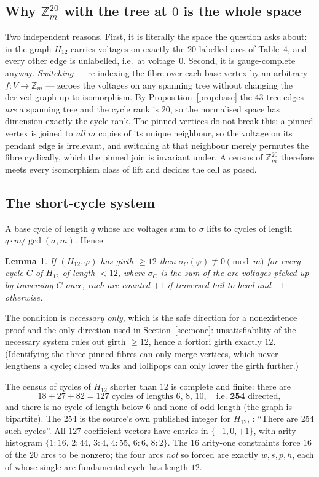 \documentclass[11pt]{amsart}
\newtheorem{lemma}[theorem]{Lemma}
\theoremstyle{remark}
\begin{document}
\subsection*{Why $\mathbb{Z}_m^{20}$ with the tree at $0$ is the whole space}
Two independent reasons. First, it is literally the space the question asks about: in
\cite{AAB} the graph $H_{12}$ carries voltages on exactly the $20$ labelled arcs of Table~4,
and every other edge is unlabelled, i.e.\ at voltage~$0$. Second, it is gauge-complete anyway.
\emph{Switching} --- re-indexing the fibre over each base vertex by an arbitrary
$f\colon V\to\mathbb{Z}_m$ --- zeroes the voltages on any spanning tree without changing the
derived graph up to isomorphism. By Proposition~\ref{prop:base} the $43$ tree edges \emph{are}
a spanning tree and the cycle rank is $20$, so the normalised space has dimension exactly the
cycle rank. The pinned vertices do not break this: a pinned vertex is joined to \emph{all} $m$
copies of its unique neighbour, so the voltage on its pendant edge is irrelevant, and switching
at that neighbour merely permutes the fibre cyclically, which the pinned join is invariant
under. A census of $\mathbb{Z}_m^{20}$ therefore meets every isomorphism class of lift and
decides the cell as posed.

\subsection*{The short-cycle system}
A base cycle of length $q$ whose arc voltages sum to $\sigma$ lifts to cycles of length
$q\cdot m/\gcd(\sigma,m)$. Hence

\begin{lemma}\label{lem:nec}
If $(H_{12},\varphi)$ has girth $\ge 12$ then $\sigma_C(\varphi)\not\equiv 0 \pmod m$ for every
cycle $C$ of $H_{12}$ of length $<12$, where $\sigma_C$ is the sum of the arc voltages picked
up by traversing $C$ once, each arc counted $+1$ if traversed tail to head and $-1$ otherwise.
\end{lemma}

The condition is \emph{necessary only}, which is the safe direction for a nonexistence proof and
the only direction used in Section~\ref{sec:none}: unsatisfiability of the necessary system
rules out girth $\ge 12$, hence a fortiori girth exactly $12$. (Identifying the three pinned
fibres can only merge vertices, which never lengthens a cycle; closed walks and lollipops can
only lower the girth further.)

The census of cycles of $H_{12}$ shorter than $12$ is complete and finite: there are
\[
 18 + 27 + 82 = 127 \text{ cycles of lengths } 6,\,8,\,10,
 \quad\text{i.e. } \mathbf{254} \text{ directed},
\]
and there is no cycle of length below $6$ and none of odd length (the graph is bipartite). The
$254$ is the source's own published integer for $H_{12}$, \cite[p.~27]{AAB}: ``There are 254
such cycles''. All $127$ coefficient vectors have entries in $\{-1,0,+1\}$, with arity
histogram $\{1{:}16,\,2{:}44,\,3{:}4,\,4{:}55,\,6{:}6,\,8{:}2\}$. The $16$ arity-one
constraints force $16$ of the $20$ arcs to be nonzero; the four arcs \emph{not} so forced are
exactly $w,s,p,h$, each of whose single-arc fundamental cycle has length $12$.
\end{document}

